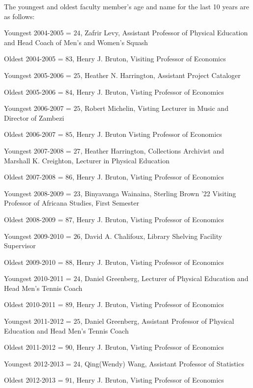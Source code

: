 \documentclass[12pt,a4paper]{article}\usepackage[]{graphicx}\usepackage[]{color}
\theoremstyle{definition}
\begin{document}
\bigskip
The youngest and oldest faculty member's age and name for the last 10 years are as follows:

\bigskip
Youngest 2004-2005 = \(24\), Zafrir Levy, Assistant Professor of Physical Education and Head Coach of Men's and Women's Squash

\bigskip
Oldest 2004-2005 = \(83\), Henry J. Bruton, Visiting Professor of Economics

\bigskip
Youngest 2005-2006 = \(25\), Heather N. Harrington, Assistant Project Cataloger

\bigskip
Oldest 2005-2006 = \(84\), Henry J. Bruton, Visting Professor of Economics

\bigskip
Youngest 2006-2007 = \(25\), Robert Michelin, Visting Lecturer in Music and Director of Zambezi

\bigskip
Oldest 2006-2007 = \(85\), Henry J. Bruton Visting Professor of Economics

\bigskip
Youngest 2007-2008 = \(27\), Heather Harrington, Collections Archivist and Marshall K. Creighton, Lecturer in Physical Education

\bigskip
Oldest 2007-2008 = \(86\), Henry J. Bruton, Visting Professor of Economics

\bigskip
Youngest 2008-2009 = \(23\), Binyavanga Wainaina, Sterling Brown '22 Visiting Professor of Africana Studies, First Semester

\bigskip
Oldest 2008-2009 = \(87\), Henry J. Bruton, Visting Professor of Economics

\bigskip
Youngest 2009-2010 = \(26\), David A. Chalifoux, Library Shelving Facility Supervisor

\bigskip
Oldest 2009-2010 = \(88\), Henry J. Bruton, Visting Professor of Economics

\bigskip
Youngest 2010-2011 = \(24\), Daniel Greenberg, Lecturer of Physical Education and Head Men's Tennis Coach

\bigskip
Oldest 2010-2011 = \(89\), Henry J. Bruton, Visting Professor of Economics

\bigskip
Youngest 2011-2012 = \(25\), Daniel Greenberg, Assistant Professor of Physical Education and Head Men's Tennis Coach

\bigskip
Oldest 2011-2012 = \(90\), Henry J. Bruton, Visting Professor of Economics

\bigskip
Youngest 2012-2013 = \(24\), Qing(Wendy) Wang, Assistant Professor of Statistics

\bigskip
Oldest 2012-2013 = \(91\), Henry J. Bruton, Visting Professor of Economics
\end{document}
